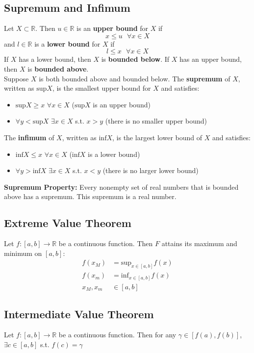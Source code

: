 \documentclass{article}
\newcommand{\R}{\mathbb{R}}
\begin{document}
\subsection{Supremum and Infimum}
Let $X\subset\R$. Then $u\in\R$ is an \textbf{upper bound} for $X$ if 
\[
	x\leq u\text{ }\forall x\in X 
\]
and $l\in\R$ is a \textbf{lower bound} for $X$ if 
\[
	l\leq x\text{ }\forall x\in X 
\]
If $X$ has a lower bound, then $X$ is \textbf{bounded below}. If $X$ has an upper bound, then $X$ is \textbf{bounded above}.
\medskip \\
Suppose $X$ is both bounded above and bounded below. The \textbf{supremum} of $X$, written as $\text{sup}X$, is the smallest upper bound for $X$ and satisfies:
\begin{itemize}
	\item $\text{sup}X\geq x$ $\forall x\in X$ 					\indent ($\text{sup}X$ is an upper bound)
	\item $\forall y<\text{sup}X$ $\exists x\in X$ s.t. $x>y$ 	\indent (there is no smaller upper bound)
\end{itemize}
The \textbf{infimum} of $X$, written as $\text{inf}X$, is the largest lower bound of $X$ and satisfies:
\begin{itemize}
	\item $\text{inf}X\leq x$ $\forall x\in X$ 					\indent ($\text{inf}X$ is a lower bound)
	\item $\forall y>\text{inf}X$ $\exists x\in X$ s.t. $x<y$ 	\indent (there is no larger lower bound)
\end{itemize}
\medskip
\textbf{Supremum Property:} Every nonempty set of real numbers that is bounded above has a supremum. This supremum is a real number.

\subsection{Extreme Value Theorem}
Let $f:[a,b]\rightarrow\R$ be a continuous function. Then $F$ attains its maximum and minimum on $[a,b]$:
\begin{align*}
	f(x_M) &= \text{sup}_{x\in[a,b]}f(x) \\
	f(x_m) &= \text{inf}_{x\in[a,b]}f(x) \\
	x_M,x_m &\in[a,b]
\end{align*}

\subsection{Intermediate Value Theorem}
Let $f:[a,b]\rightarrow\R$ be a continuous function. Then for any $\gamma\in[f(a),f(b)]$, $\exists c\in[a,b]$ s.t. $f(c)=\gamma$
\end{document}
